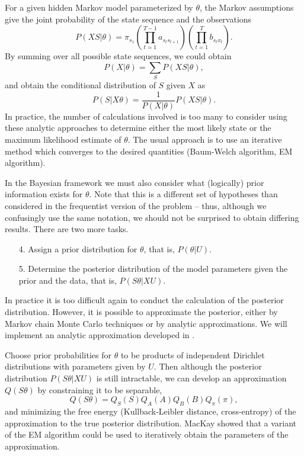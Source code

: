 \documentclass{article}
\begin{document}
For a
given hidden Markov model parameterized by $\theta$, the Markov
assumptions give the joint probability of the state sequence and the
observations
\[
P(XS|\theta ) =
\pi_{s_1}
\left( \prod_{t=1}^{T-1} a_{s_t s_{t+1}} \right)
\left( \prod_{t=1}^{T} b_{s_t x_t} \right).
\]
By summing over all possible state sequences, we could
obtain
\[ P(X|\theta ) = \sum_S P(XS|\theta ), \]
and obtain the conditional distribution of $S$ given $X$ as
\[ P(S|X\theta) = \frac {1}{ P(X|\theta ) } P(XS|\theta). \]
In practice, the number of calculations involved is too many
to consider using these analytic approaches to determine either
the most likely state or the maximum likelihood estimate of $\theta$.
The usual approach is to use an iterative method which converges to
the desired quantities (Baum-Welch algorithm, EM algorithm).

In the Bayesian framework we must also consider what (logically) prior
information exists for $\theta$.  Note that this is a different set of
hypotheses than considered in the frequentist version of the problem
-- thus, although we confusingly use the same notation, we should not
be surprised to obtain differing results.  There are two more tasks.
\begin{enumerate}
\item[4.] Assign a prior distribution for $\theta$, that is, $P(\theta|U)$.
\item[5.] Determine the posterior distribution of the model parameters
  given the prior and the data, that is, $P(S \theta|XU)$.
\end{enumerate}

In practice it is too difficult again to conduct the calculation of
the posterior distribution.  However, it is possible to approximate
the posterior, either by Markov chain Monte Carlo techniques or by
analytic approximations.  We will implement an analytic approximation
developed in \cite{mackay:1996}.

Choose prior probabilities for $\theta$ to be
products of independent Dirichlet distributions with parameters given by $U$.
Then although the posterior distribution $P(S \theta |X U)$ is still
intractable, we can develop an approximation $Q(S \theta)$ by
constraining it to be separable,
\[ Q(S \theta) = Q_S(S) Q_A(A) Q_B(B) Q_\pi(\pi), \]
and minimizing the free energy (Kullback-Leibler distance,
cross-entropy) of the approximation to the true posterior distribution.
MacKay showed that a variant of the EM algorithm could be used to
iteratively obtain the parameters of the approximation.
\end{document}

